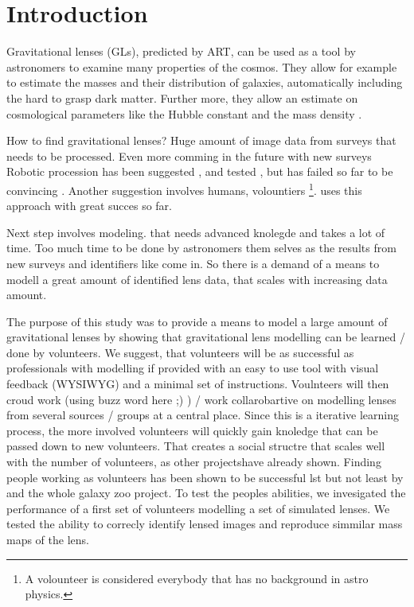\section{Introduction}


Gravitational lenses (GLs), predicted by ART, can be used as a tool by astronomers to examine many properties of the cosmos.
They allow for example to estimate the masses and their distribution of galaxies, automatically including the hard to grasp dark matter.
Further more, they allow an estimate on cosmological parameters like the Hubble constant \citep{Saha2006} and the mass density \needcite.


How to find gravitational lenses? Huge amount of image data from surveys that needs to be processed.
Even more comming in the future with new surveys \needcite
Robotic procession has been suggested \needcite, and tested \needcite, but has failed so far to be convincing \needcite.
Another suggestion involves humans, volountiers \footnote{A volounteer is considered everybody that has no background in astro physics.}.
\sw uses this approach with great succes so far.\needcite


Next step involves modeling. that needs advanced knolegde and takes a lot of time.
Too much time to be done by astronomers them selves as the results from new surveys and identifiers like \sw come in.
So there is a demand of a means to modell a great amount of identified lens data, that scales with increasing data amount.


The purpose of this study was to provide a means to model a large amount of gravitational lenses by showing that gravitational lens modelling can be learned / done by volunteers.
We suggest, that volunteers will be as successful as professionals with modelling if provided with an easy to use tool with visual feedback (WYSIWYG) and a minimal set of instructions.
Voulnteers will then croud work (using buzz word here ;) ) / work collarobartive on modelling lenses from several sources / groups at a central place.
Since this is a iterative learning process, the more involved volunteers will quickly gain knoledge that can be passed down to new volunteers.
That creates a social structre that scales well with the number of volunteers, as other projects\needcite have already shown.
Finding people working as volunteers has been shown to be successful lst but not least by \sw and the whole galaxy zoo project.
To test the peoples abilities, we invesigated the performance of a first set of volunteers modelling a set of simulated lenses.
We tested the ability to correcly identify lensed images and reproduce simmilar mass maps of the lens.
